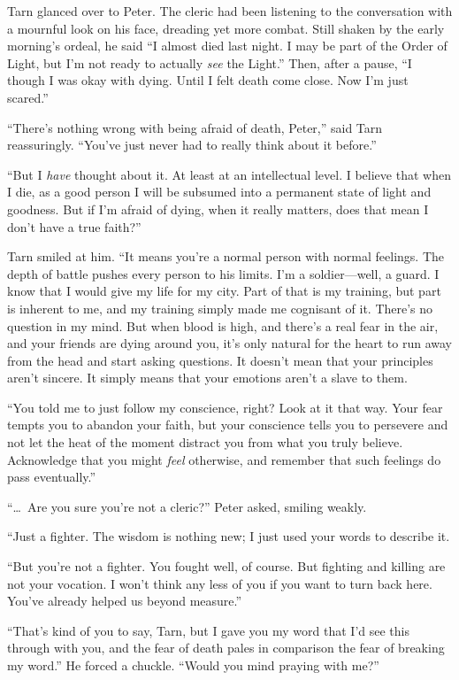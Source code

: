 Tarn glanced over to Peter.  The cleric had been listening to the conversation with a mournful look on his face, dreading yet more combat.  Still shaken by the early morning's ordeal, he said ``I almost died last night.  I may be part of the Order of Light, but I'm not ready to actually \emph{see} the Light.''  Then, after a pause, ``I though I was okay with dying.  Until I felt death come close.  Now I'm just scared.''

``There's nothing wrong with being afraid of death, Peter,'' said Tarn reassuringly.  ``You've just never had to really think about it before.''

``But I \emph{have} thought about it.  At least at an intellectual level.  I believe that when I die, as a good person I will be subsumed into a permanent state of light and goodness.  But if I'm afraid of dying, when it really matters, does that mean I don't have a true faith?''

Tarn smiled at him.  ``It means you're a normal person with normal feelings.  The depth of battle pushes every person to his limits.  I'm a soldier---well, a guard.  I know that I would give my life for my city.  Part of that is my training, but part is inherent to me, and my training simply made me cognisant of it.  There's no question in my mind.  But when blood is high, and there's a real fear in the air, and your friends are dying around you, it's only natural for the heart to run away from the head and start asking questions.  It doesn't mean that your principles aren't sincere.  It simply means that your emotions aren't a slave to them.

``You told me to just follow my conscience, right?  Look at it that way.  Your fear tempts you to abandon your faith, but your conscience tells you to persevere and not let the heat of the moment distract you from what you truly believe.  Acknowledge that you might \emph{feel} otherwise, and remember that such feelings do pass eventually.''

``\ldots\ Are you sure you're not a cleric?'' Peter asked, smiling weakly.

``Just a fighter.  The wisdom is nothing new; I just used your words to describe it.

``But you're not a fighter.  You fought well, of course.  But fighting and killing are not your vocation.  I won't think any less of you if you want to turn back here.  You've already helped us beyond measure.''

``That's kind of you to say, Tarn, but I gave you my word that I'd see this through with you, and the fear of death pales in comparison the fear of breaking my word.''  He forced a chuckle.  ``Would you mind praying with me?''

